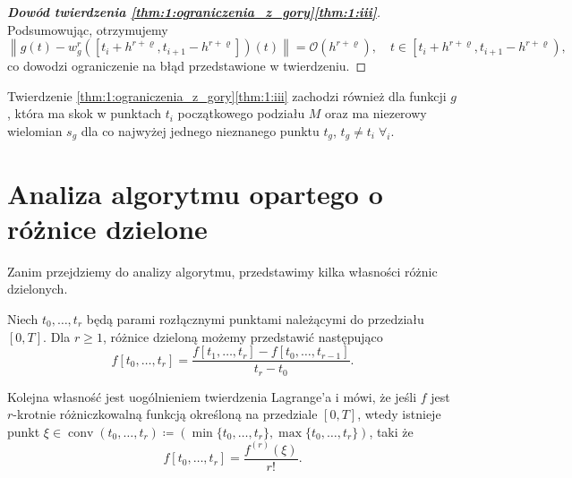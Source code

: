 \documentclass[oik, pdftex, man]{mgrwms}
\DeclareMathOperator*{\conv}{conv}
\begin{document}
\begin{proof}[\textbf{Dowód twierdzenia \ref{thm:1:ograniczenia_z_gory}\ref{thm:1:iii}}]
        Podsumowując, otrzymujemy
        \begin{equation*}
            \left\|g(t)-w_{g}^{r}\left(\left[t_{i}+h^{r+\varrho}, t_{i+1}-h^{r+\varrho}\right]\right)(t)\right\|=\mathcal{O}\left(h^{r+\varrho}\right), \quad t \in\left[t_{i}+h^{r+\varrho}, t_{i+1}-h^{r+\varrho}\right),
        \end{equation*}
        co dowodzi ograniczenie na błąd przedstawione w twierdzeniu.

    \end{proof}

    \begin{uw}
        Twierdzenie \ref{thm:1:ograniczenia_z_gory}\ref{thm:1:iii} zachodzi również dla funkcji $g$, która ma skok w punktach $t_{i}$ początkowego podziału $M$ oraz ma niezerowy wielomian $s_{g}$ dla co najwyżej jednego nieznanego punktu $t_{g}$, $t_{g} \neq t_{i} \; \forall_{i}$.
    \end{uw}


\section{Analiza algorytmu opartego o różnice dzielone}


    Zanim przejdziemy do analizy algorytmu, przedstawimy kilka własności różnic dzielonych.

    Niech $t_{0}, \ldots, t_{r}$ będą parami rozłącznymi punktami należącymi do przedziału $[0, T]$. Dla $r \geq 1$, różnice dzieloną możemy przedstawić następująco
    \begin{equation*}
        f[t_{0}, \ldots, t_{r}] = \frac{f[t_{1}, \ldots, t_{r}] - f[t_{0}, \ldots, t_{r-1}]}{t_{r}-t_{0}}.
    \end{equation*}
    
    Kolejna własność jest uogólnieniem twierdzenia Lagrange'a i mówi, że jeśli $f$ jest $r$-krotnie różniczkowalną funkcją określoną na przedziale $[0,T]$, wtedy istnieje punkt $\xi \in \conv (t_{0}, \ldots, t_{r}) \coloneqq \left( \min \{t_{0}, \ldots, t_{r}\}, \max \{t_{0}, \ldots, t_{r}\} \right)$, taki że
    \begin{equation*} %
        f\left[ t_{0}, \ldots, t_{r} \right] = \frac{f^{(r)}(\xi)}{r!}.
    \end{equation*}
    
\end{document}
